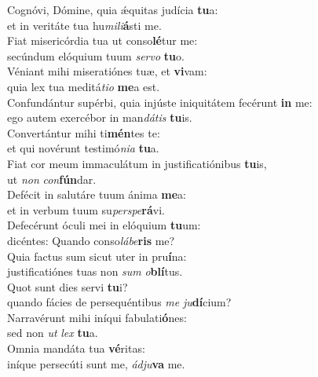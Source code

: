 \oddverse Cognóvi, Dómine, quia ǽquitas judícia \textbf{tu}a:~\*\\
\oddverse et in veritáte tua hu\textit{mi}\textit{li}\textbf{á}sti me.\\
\evenverse Fiat misericórdia tua ut conso\textbf{lé}tur me:~\*\\
\evenverse secúndum elóquium tuum \textit{ser}\textit{vo} \textbf{tu}o.\\
\oddverse Véniant mihi miseratiónes tuæ, et \textbf{vi}vam:~\*\\
\oddverse quia lex tua meditá\textit{ti}\textit{o} \textbf{me}a est.\\
\evenverse Confundántur supérbi, quia injúste iniquitátem fecérunt \textbf{in} me:~\*\\
\evenverse ego autem exercébor in man\textit{dá}\textit{tis} \textbf{tu}is.\\
\oddverse Convertántur mihi ti\textbf{mén}tes te:~\*\\
\oddverse et qui novérunt testimó\textit{ni}\textit{a} \textbf{tu}a.\\
\evenverse Fiat cor meum immaculátum in justificatiónibus \textbf{tu}is,~\*\\
\evenverse ut \textit{non} \textit{con}\textbf{fún}dar.\\
\oddverse Defécit in salutáre tuum ánima \textbf{me}a:~\*\\
\oddverse et in verbum tuum su\textit{per}\textit{spe}\textbf{rá}vi.\\
\evenverse Defecérunt óculi mei in elóquium \textbf{tu}um:~\*\\
\evenverse dicéntes: Quando conso\textit{lá}\textit{be}\textbf{ris} me?\\
\oddverse Quia factus sum sicut uter in pru\textbf{í}na:~\*\\
\oddverse justificatiónes tuas non \textit{sum} \textit{o}\textbf{blí}tus.\\
\evenverse Quot sunt dies servi \textbf{tu}i?~\*\\
\evenverse quando fácies de persequéntibus \textit{me} \textit{ju}\textbf{dí}cium?\\
\oddverse Narravérunt mihi iníqui fabulati\textbf{ó}nes:~\*\\
\oddverse sed non \textit{ut} \textit{lex} \textbf{tu}a.\\
\evenverse Omnia mandáta tua \textbf{vé}ritas:~\*\\
\evenverse iníque persecúti sunt me, \textit{ád}\textit{ju}\textbf{va} me.\\
